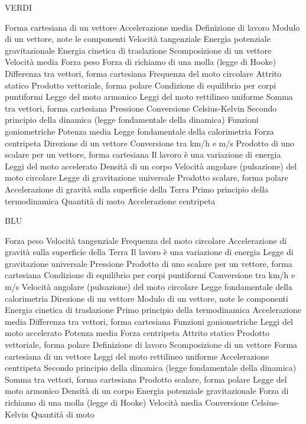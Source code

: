 \documentclass[a4paper,11pt,italian]{article}
\begin{document}
VERDI
\begin{enumerate}
{Forma cartesiana di un vettore}
{Accelerazione media}
{Definizione di lavoro}
{Modulo di un vettore, note le componenti}
{Velocità tangenziale}
{Energia potenziale gravitazionale}
{Energia cinetica di traslazione}
{Scomposizione di un vettore}
{Velocità media}
{Forza peso}
{Forza di richiamo di una molla (legge di Hooke)}
{Differenza tra vettori, forma cartesiana}
{Frequenza del moto circolare}
{Attrito statico}
{Prodotto vettoriale, forma polare}
{Condizione di equilibrio per corpi puntiformi}
{Legge del moto armonico}
{Leggi del moto rettilineo uniforme}
{Somma tra vettori, forma cartesiana}
{Pressione}
{Conversione Celsius-Kelvin}
{Secondo principio della dinamica (legge fondamentale della dinamica)}
{Funzioni goniometriche}
{Potenza media}
{Legge fondamentale della calorimetria}
{Forza centripeta}
{Direzione di un vettore}
{Conversione tra km/h e m/s}
{Prodotto di uno scalare per un vettore, forma cartesiana}
{Il lavoro è una variazione di energia}
{Leggi del moto accelerato}
{Densità di un corpo}
{Velocità angolare (pulsazione) del moto circolare}
{Legge di gravitazione universale}
{Prodotto scalare, forma polare}
{Accelerazione di gravità sulla superficie della Terra}
{Primo principio della termodinamica}
{Quantità di moto}
{Accelerazione centripeta}
\end{enumerate}





BLU
\begin{enumerate}
{Forza peso}
{Velocità tangenziale}
{Frequenza del moto circolare}
{Accelerazione di gravità sulla superficie della Terra}
{Il lavoro è una variazione di energia}
{Legge di gravitazione universale}
{Pressione}
{Prodotto di uno scalare per un vettore, forma cartesiana}
{Condizione di equilibrio per corpi puntiformi}
{Conversione tra km/h e m/s}
{Velocità angolare (pulsazione) del moto circolare}
{Legge fondamentale della calorimetria}
{Direzione di un vettore}
{Modulo di un vettore, note le componenti}
{Energia cinetica di traslazione}
{Primo principio della termodinamica}
{Accelerazione media}
{Differenza tra vettori, forma cartesiana}
{Funzioni goniometriche}
{Leggi del moto accelerato}
{Potenza media}
{Forza centripeta}
{Attrito statico}
{Prodotto vettoriale, forma polare}
{Definizione di lavoro}
{Scomposizione di un vettore}
{Forma cartesiana di un vettore}
{Leggi del moto rettilineo uniforme}
{Accelerazione centripeta}
{Secondo principio della dinamica (legge fondamentale della dinamica)}
{Somma tra vettori, forma cartesiana}
{Prodotto scalare, forma polare}
{Legge del moto armonico}
{Densità di un corpo}
{Energia potenziale gravitazionale}
{Forza di richiamo di una molla (legge di Hooke)}
{Velocità media}
{Conversione Celsius-Kelvin}
{Quantità di moto}
\end{enumerate}
\end{document}
